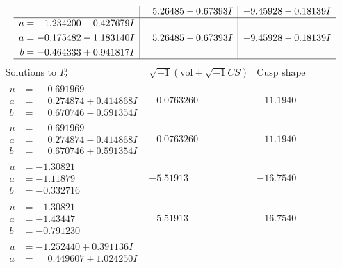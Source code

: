\documentclass[1p]{elsarticle_modified}
\theoremstyle{definition}
\newcommand{\I}{\sqrt{-1}}
\begin{document}
$$\begin{array}{c|c|c}
 & \phantom{-}5.26485 - 0.67393 I & -9.45928 - 0.18139 I \\ \hline\begin{aligned}
u &= \phantom{-}1.234200 - 0.427679 I \\
a &= -0.175482 - 1.183140 I \\
b &= -0.464333 + 0.941817 I\end{aligned}
 & \phantom{-}5.26485 - 0.67393 I & -9.45928 - 0.18139 I\\
 \hline 
 \end{array}$$\newpage$$\begin{array}{c|c|c}  
\text{Solutions to }I^u_{2}& \I (\text{vol} + \sqrt{-1}CS) & \text{Cusp shape}\\
 \hline 
\begin{aligned}
u &= \phantom{-}0.691969\phantom{ +0.000000I} \\
a &= \phantom{-}0.274874 + 0.414868 I \\
b &= \phantom{-}0.670746 - 0.591354 I\end{aligned}
 & -0.0763260\phantom{ +0.000000I} & -11.1940\phantom{ +0.000000I} \\ \hline\begin{aligned}
u &= \phantom{-}0.691969\phantom{ +0.000000I} \\
a &= \phantom{-}0.274874 - 0.414868 I \\
b &= \phantom{-}0.670746 + 0.591354 I\end{aligned}
 & -0.0763260\phantom{ +0.000000I} & -11.1940\phantom{ +0.000000I} \\ \hline\begin{aligned}
u &= -1.30821\phantom{ +0.000000I} \\
a &= -1.11879\phantom{ +0.000000I} \\
b &= -0.332716\phantom{ +0.000000I}\end{aligned}
 & -5.51913\phantom{ +0.000000I} & -16.7540\phantom{ +0.000000I} \\ \hline\begin{aligned}
u &= -1.30821\phantom{ +0.000000I} \\
a &= -1.43447\phantom{ +0.000000I} \\
b &= -0.791230\phantom{ +0.000000I}\end{aligned}
 & -5.51913\phantom{ +0.000000I} & -16.7540\phantom{ +0.000000I} \\ \hline\begin{aligned}
u &= -1.252440 + 0.391136 I \\
a &= \phantom{-}0.449607 + 1.024250 I \\

\end{aligned}
\end{array}$$
\end{document}
